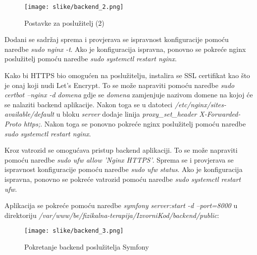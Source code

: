 \begin{packed_item}
				\begin{figure}[H]
					\texttt{[image: slike/backend\_2.png]} %
					\centering
					\caption{Postavke za poslužitelj (2)}
					\label{fig:nginxconfig2}
				\end{figure}
			
			
				\item Dodani se sadržaj sprema i provjerava se ispravnost konfiguracije pomoću naredbe \textit{sudo nginx -t}. Ako je konfiguracija ispravna, ponovno se pokreće nginx poslužitelj pomoću naredbe \textit{sudo systemctl restart nginx}.
				\item Kako bi HTTPS bio omogućen na poslužitelju, instalira se SSL certifikat kao što je onaj koji nudi Let's Encrypt. To se može napraviti pomoću naredbe \textit{sudo certbot --nginx -d domena} gdje se \textit{domena} zamjenjuje nazivom domene na kojoj će se nalaziti backend aplikacije. Nakon toga se u datoteci \textit{/etc/nginx/sites-available/default} u bloku \textit{server} dodaje linija \textit{proxy\_set\_header X-Forwarded-Proto https;}. Nakon toga se ponovno pokreće nginx poslužitelj pomoću naredbe \textit{sudo systemctl restart nginx}.
				\item Kroz vatrozid se omogućava pristup backend aplikaciji. To se može napraviti pomoću naredbe \textit{sudo ufw allow 'Nginx HTTPS'}. Sprema se i provjerava se ispravnost konfiguracije pomoću naredbe \textit{sudo ufw status}. Ako je konfiguracija ispravna, ponovno se pokreće vatrozid pomoću naredbe \textit{sudo systemctl restart ufw}.
				\item Aplikacija se pokreće pomoću naredbe \textit{symfony server:start -d --port=8000} u direktoriju \textit{/var/www/be/fizikalna-terapija/IzvorniKod/backend/public}:
				
				
				\begin{figure}[H]
					\texttt{[image: slike/backend\_3.png]} %
					\centering
					\caption{Pokretanje backend poslužitelja Symfony}
					\label{fig:symfonystart}
				\end{figure}
			
			
			\end{packed_item}

			
			
			
			\eject 